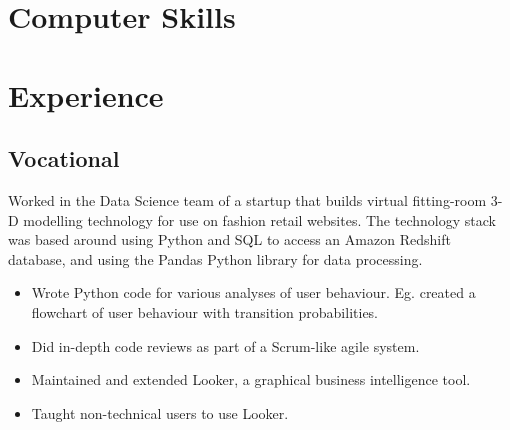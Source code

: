 \documentclass[11pt,a4paper,sans]{moderncv} %
\begin{document}


\section{Computer Skills}




\section{Experience}

\subsection{Vocational}

{Worked in the Data Science team of a startup that builds virtual fitting-room 3-D modelling technology for use on fashion retail websites.  The technology stack was based around using Python and SQL to access an Amazon Redshift database, and using the Pandas Python library for data processing.
\begin{itemize}
	\item Wrote Python code for various analyses of user behaviour.  Eg. created a flowchart of user behaviour with transition probabilities.
	\item Did in-depth code reviews as part of a Scrum-like agile system.
	\item Maintained and extended Looker, a graphical business intelligence tool.
	\item Taught non-technical users to use Looker.
\end{itemize}
}
\end{document}
